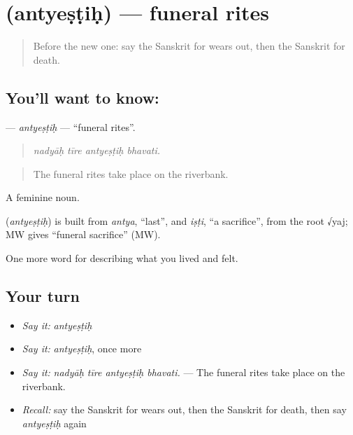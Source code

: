 \section[\texorpdfstring{\sk{अन्त्येष्टिः} (antyeṣṭiḥ)}{अन्त्येष्टिः (antyeṣṭiḥ)}]{ (antyeṣṭiḥ) — funeral rites}

\label{lesson:SA-C491-antyestih}



\begin{quote}
Before the new one: say the Sanskrit for wears out, then the Sanskrit for death.
\end{quote}

\subsection*{You'll want to know: }
\textbf{} — \emph{antyeṣṭiḥ} — \textquotedblleft{}funeral rites\textquotedblright{}.

\begin{quote}
   
\end{quote}

\begin{quote}
\emph{nadyāḥ tīre antyeṣṭiḥ bhavati.}
\end{quote}

\begin{quote}
The funeral rites take place on the riverbank.
\end{quote}

A feminine noun.

\begin{cousinweb}
\textbf{} (\emph{antyeṣṭiḥ}) is built from \emph{antya}, \textquotedblleft{}last\textquotedblright{}, and \emph{iṣṭi}, \textquotedblleft{}a sacrifice\textquotedblright{}, from the root √yaj; MW gives \textquotedblleft{}funeral sacrifice\textquotedblright{} (MW).
\end{cousinweb}

\begin{grammarlens}[title={What you've built}]
One more word for describing what you lived and felt.
\end{grammarlens}

\subsection*{Your turn}
\begin{itemize}
\raggedright
  \item \emph{Say it:} \emph{antyeṣṭiḥ}
  \item \emph{Say it:} \emph{antyeṣṭiḥ}, once more
  \item \emph{Say it:} \emph{nadyāḥ tīre antyeṣṭiḥ bhavati.} — The funeral rites take place on the riverbank.
  \item \emph{Recall:} say the Sanskrit for wears out, then the Sanskrit for death, then say \emph{antyeṣṭiḥ} again
\end{itemize}

